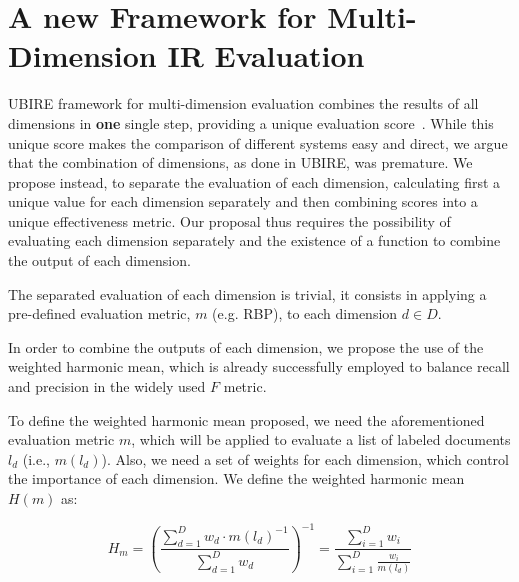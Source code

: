 
\section{A new Framework for Multi-Dimension IR Evaluation}
\label{sec:extension}

UBIRE framework for multi-dimension evaluation combines the results of all dimensions in \textbf{one} single step, providing a unique evaluation score~\cite{zuccon14,zuccon16}.
While this unique score makes the comparison of different systems easy and direct, we argue that the combination of dimensions, as done in UBIRE, was premature.
We propose instead, to separate the evaluation of each dimension, calculating first a unique value for each dimension separately and then combining scores into a unique effectiveness metric.
Our proposal thus requires the possibility of evaluating each dimension separately and the existence of a function to combine the output of each dimension.

The separated evaluation of each dimension is trivial, it consists in applying a pre-defined evaluation metric, $m$ (e.g. RBP), to each dimension $d \in D$.

In order to combine the outputs of each dimension, we propose the use of the weighted harmonic mean, which is already successfully employed to balance recall and precision in the widely used $F$ metric.


To define the weighted harmonic mean proposed, we need the aforementioned evaluation metric $m$, which will be applied to evaluate a list of labeled documents $l_d$ (i.e., $m(l_d)$).
Also, we need a set of weights for each dimension, which control the importance of each dimension.
We define the weighted harmonic mean $H(m)$ as:

\begin{equation}
    H_m  = \left( \frac{\sum\limits_{d=1}^D w_d \cdot m(l_d)^{-1}}{\sum\limits_{d=1}^D w_d} \right)^{-1}
          = \frac{\sum\limits_{i=1}^D w_i}{\sum\limits_{i=1}^D \frac{w_i}{m(l_d)}}
\label{eq:H}
\end{equation}

%
%
%


